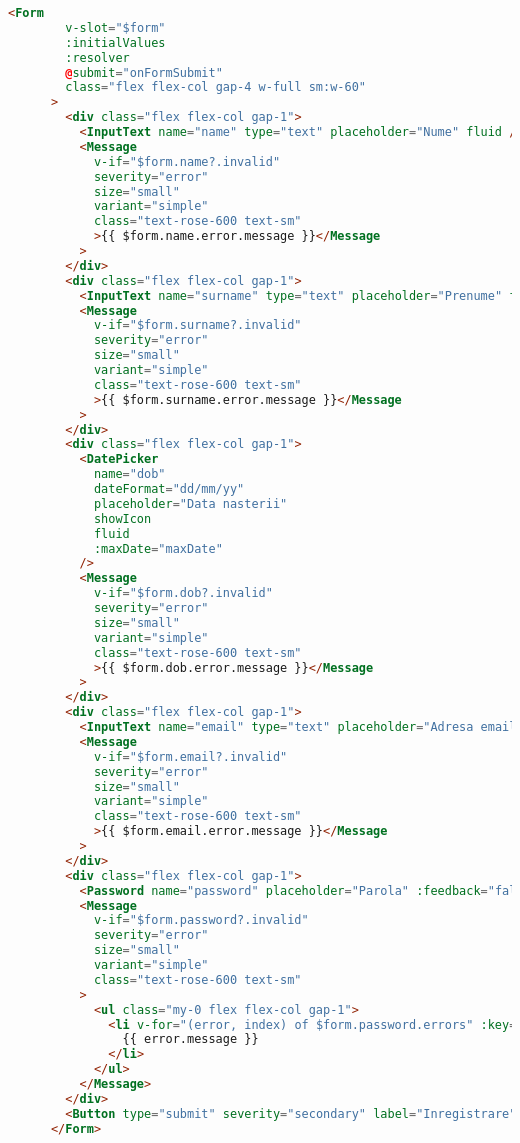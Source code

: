 \begin{lstlisting}[language=HTML, caption=PrimeVue components in the Register page]
    <Form
        v-slot="$form"
        :initialValues
        :resolver
        @submit="onFormSubmit"
        class="flex flex-col gap-4 w-full sm:w-60"
      >
        <div class="flex flex-col gap-1">
          <InputText name="name" type="text" placeholder="Nume" fluid />
          <Message
            v-if="$form.name?.invalid"
            severity="error"
            size="small"
            variant="simple"
            class="text-rose-600 text-sm"
            >{{ $form.name.error.message }}</Message
          >
        </div>
        <div class="flex flex-col gap-1">
          <InputText name="surname" type="text" placeholder="Prenume" fluid />
          <Message
            v-if="$form.surname?.invalid"
            severity="error"
            size="small"
            variant="simple"
            class="text-rose-600 text-sm"
            >{{ $form.surname.error.message }}</Message
          >
        </div>
        <div class="flex flex-col gap-1">
          <DatePicker
            name="dob"
            dateFormat="dd/mm/yy"
            placeholder="Data nasterii"
            showIcon
            fluid
            :maxDate="maxDate"
          />
          <Message
            v-if="$form.dob?.invalid"
            severity="error"
            size="small"
            variant="simple"
            class="text-rose-600 text-sm"
            >{{ $form.dob.error.message }}</Message
          >
        </div>
        <div class="flex flex-col gap-1">
          <InputText name="email" type="text" placeholder="Adresa email" fluid />
          <Message
            v-if="$form.email?.invalid"
            severity="error"
            size="small"
            variant="simple"
            class="text-rose-600 text-sm"
            >{{ $form.email.error.message }}</Message
          >
        </div>
        <div class="flex flex-col gap-1">
          <Password name="password" placeholder="Parola" :feedback="false" toggleMask fluid />
          <Message
            v-if="$form.password?.invalid"
            severity="error"
            size="small"
            variant="simple"
            class="text-rose-600 text-sm"
          >
            <ul class="my-0 flex flex-col gap-1">
              <li v-for="(error, index) of $form.password.errors" :key="index">
                {{ error.message }}
              </li>
            </ul>
          </Message>
        </div>
        <Button type="submit" severity="secondary" label="Inregistrare" />
      </Form>
\end{lstlisting}

